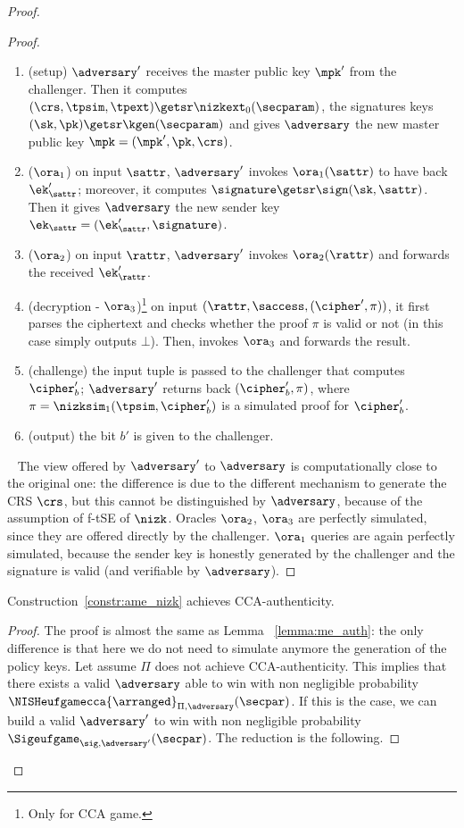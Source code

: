 \begin{proof}
\begin{lemma}
\begin{proof}
            \begin{enumerate}
                \item (setup) $\adversary'$ receives the master public key $\mpk'$ from the challenger. Then it computes $(\crs,\tpsim,\tpext)\getsr\nizkext_0(\secparam)$, the signatures keys $(\sk, \pk) \getsr \kgen(\secparam)$ and gives $\adversary$ the new master public key $\mpk = (\mpk', \pk, \crs)$.
                \item ($\ora_1$) on input $\sattr$, $\adversary'$ invokes $\ora_1(\sattr)$ to have back $\ek'_\sattr$; moreover, it computes $\signature \getsr \sign(\sk, \sattr)$. Then it gives $\adversary$ the new sender key $\ek_\sattr = (\ek'_\sattr, \signature)$.
                \item ($\ora_2$) on input $\rattr$, $\adversary'$ invokes $\ora_2(\rattr)$ and forwards the received $\ek'_\rattr$.
                \item (decryption - $\ora_3$)\footnote{Only for CCA game.} on input $(\rattr, \saccess, (\cipher', \pi))$, it first parses the ciphertext and checks whether the proof $\pi$ is valid or not (in this case simply outputs $\bot$). Then, invokes $\ora_3$ and forwards the result.
                \item (challenge) the input tuple is passed to the challenger that computes $\cipher'_b$; $\adversary'$ returns back $(\cipher'_b, \pi)$, where $\pi = \nizksim_1(\tpsim, \cipher'_b)$ is a simulated proof for $\cipher'_b$.
                \item (output) the bit $b'$ is given to the challenger.
            \end{enumerate}
            ~\newline
            The view offered by $\adversary'$ to $\adversary$ is computationally close to the original one: the difference is due to the different mechanism to generate the CRS $\crs$, but this cannot be distinguished by $\adversary$, because of the assumption of f-tSE of $\nizk$.
            Oracles $\ora_2$, $\ora_3$ are perfectly simulated, since they are offered directly by the challenger.
            $\ora_1$ queries are again perfectly simulated, because the sender key is honestly generated by the challenger and the signature is valid (and verifiable by $\adversary$).
        \end{proof}
    \end{lemma}

    \begin{lemma}\label{lemma:ame_auth}
        Construction~\ref{constr:ame_nizk} achieves CCA-authenticity.
        \begin{proof}
            The proof is almost the same as Lemma ~\ref{lemma:me_auth}: the only difference is that here we do not need to simulate anymore the generation of the policy keys.
            Let assume $\Pi$ does not achieve CCA-authenticity. This implies that there exists a valid $\adversary$ able to win with non negligible probability $\NISHeufgamecca{\arranged}_{\Pi, \adversary}(\secpar)$. If this is the case, we can build a valid $\adversary'$ to win with non negligible probability $\Sigeufgame_{\sig, \adversary'}(\secpar)$. The reduction is the following.


\end{proof}
\end{lemma}
\end{proof}
